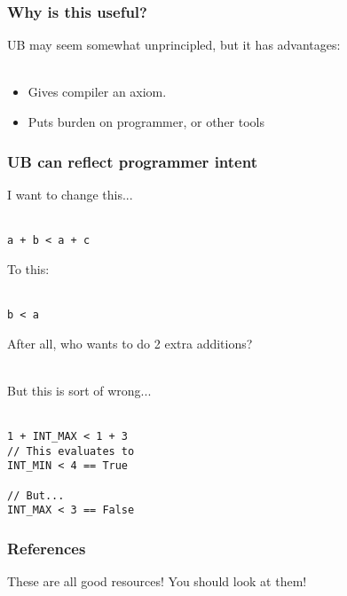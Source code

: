 \documentclass{beamer}
\begin{document}
\begin{frame}
  \frametitle{Why is this useful?}

  UB may seem somewhat unprincipled, but it has advantages:\\~

  \begin{itemize}
  \item Gives compiler an axiom.
  \item Puts burden on programmer, or other tools
  \end{itemize}

\end{frame}

\begin{frame}
  \frametitle{UB can reflect programmer intent}

  I want to change this...\\~

\begin{lstlisting}
a + b < a + c
\end{lstlisting}

  \pause

  To this:\\~

\begin{lstlisting}
b < a
\end{lstlisting}

  After all, who wants to do 2 extra additions?\\~

  \pause

  But this is sort of wrong...\\~

\begin{lstlisting}
1 + INT_MAX < 1 + 3
// This evaluates to
INT_MIN < 4 == True

// But...
INT_MAX < 3 == False
\end{lstlisting}
\end{frame}

\begin{frame}
  \frametitle{References}

  \nocite{*}
  \printbibliography

  These are all good resources! You should look at them!
\end{frame}
\end{document}
